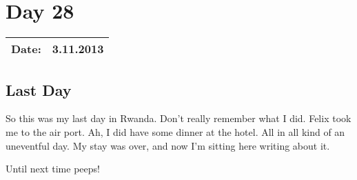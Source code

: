 \section{Day 28}
\begin{tabular}{|c|c|}
\hline
Date: & 3.11.2013 \\
\hline
\end{tabular}
\subsection{Last Day}
So this was my last day in Rwanda. Don't really remember what I did. 
Felix took me to the air port. Ah, I did have some dinner at the hotel.
All in all kind of an uneventful day.
My stay was over, and now I'm sitting here writing about it.

Until next time peeps!
